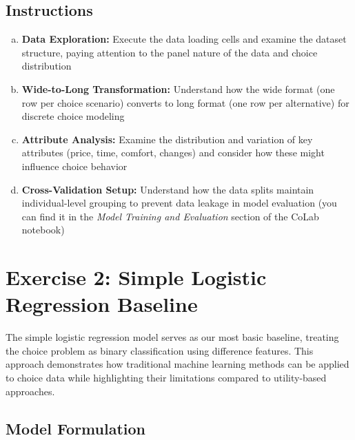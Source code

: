 \documentclass[11pt]{article}
\begin{document}
\subsection*{Instructions}

\begin{enumerate}[(a)]
\item \textbf{Data Exploration:} Execute the data loading cells and examine the dataset structure, paying attention to the panel nature of the data and choice distribution
\item \textbf{Wide-to-Long Transformation:} Understand how the wide format (one row per choice scenario) converts to long format (one row per alternative) for discrete choice modeling
\item \textbf{Attribute Analysis:} Examine the distribution and variation of key attributes (price, time, comfort, changes) and consider how these might influence choice behavior
\item \textbf{Cross-Validation Setup:} Understand how the data splits maintain individual-level grouping to prevent data leakage in model evaluation  (you can find it in the \textit{Model Training and Evaluation} section of the CoLab notebook)
\end{enumerate}

\section*{Exercise 2: Simple Logistic Regression Baseline}

\begin{center}
\end{center}

The simple logistic regression model serves as our most basic baseline, treating the choice problem as binary classification using difference features. This approach demonstrates how traditional machine learning methods can be applied to choice data while highlighting their limitations compared to utility-based approaches.

\subsection*{Model Formulation}
\end{document}
